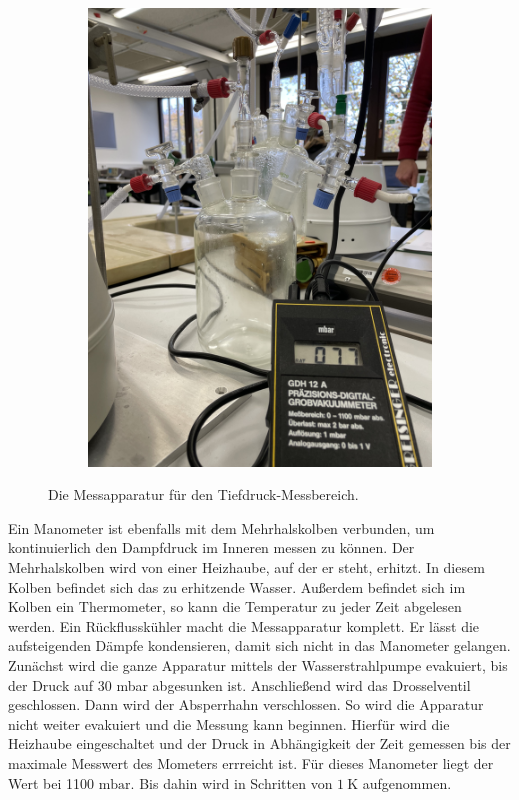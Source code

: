 \begin{figure}[H]
\begin{subfigure}{0.45\textwidth}
    \includegraphics[angle=270,scale=0.05]{content/Woulffsche_Flasche.jpeg}
    \label{Abb:Woulffsche_Flasche}
    \end{subfigure}
    \caption{Die Messapparatur für den Tiefdruck-Messbereich.}
\end{figure}\noindent
Ein Manometer ist ebenfalls mit dem Mehrhalskolben verbunden, um kontinuierlich den Dampfdruck im Inneren messen zu können.
Der Mehrhalskolben wird von einer Heizhaube, auf der er steht, erhitzt.
In diesem Kolben befindet sich das zu erhitzende Wasser.
Außerdem befindet sich im Kolben ein Thermometer, so kann die Temperatur zu jeder Zeit abgelesen werden.
Ein Rückflusskühler macht die Messapparatur komplett.
Er lässt die aufsteigenden Dämpfe kondensieren, damit sich nicht in das Manometer gelangen.
\noindent
Zunächst wird die ganze Apparatur mittels der Wasserstrahlpumpe evakuiert, bis der Druck auf 30 mbar abgesunken ist.
Anschließend wird das Drosselventil geschlossen.
Dann wird der Absperrhahn verschlossen.
So wird die Apparatur nicht weiter evakuiert und die Messung kann beginnen.
\noindent
Hierfür wird die Heizhaube eingeschaltet und der Druck in Abhängigkeit der Zeit gemessen bis der maximale Messwert des Mometers errreicht ist.
Für dieses Manometer liegt der Wert bei 1100 $\si{\milli\bar}$.
Bis dahin wird in Schritten von $\SI{1}{\kelvin}$ aufgenommen.
